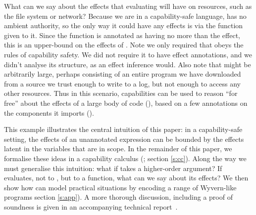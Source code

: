 What can we say about the effects that evaluating  will have on resources,
such as the file system or network? Because we are in a capability-safe language,
 has no ambient authority, so the only way it could have any effects is via
the  function given to it. Since the  function is annotated as
having no more than the  effect, this is an upper-bound on the
effects of . Note we only required that  obeys the rules of
capability safety. We did not require it to have effect annotations, and we
didn't analyse its structure, as an effect inference would. Also note that 
might be arbitrarily large, perhaps consisting of an entire program we have
downloaded from a source we trust enough to write to a log, but not enough to
access any other resources. Thus in this scenario, capabilities can be used to
reason ``for free'' about the effects of a large body of code (), based on a
few annotations on the components it imports ().

This example illustrates the central intuition of this paper: in a capability-safe setting,
the effects of an unannotated expression can be bounded by the effects latent in the
variables that are in scope. In the remainder of this paper, we formalise these ideas
in a capability calculus (; section \ref{s:cc}). Along the way we
must generalise this intuition: what if  takes a higher-order argument? If
 evaluates, not to , but to a function, what can we say about its
effects?  We then show how  can model practical situations by
encoding a range of Wyvern-like programs section \ref{s:app}). A more thorough 
discussion, including a proof of soundness is given in an accompanying technical
report~\cite{ecs:2018:aaron-tr}.
